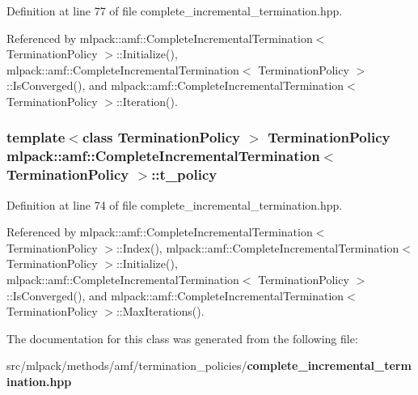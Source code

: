 Definition at line 77 of file complete\-\_\-incremental\-\_\-termination.\-hpp.



Referenced by mlpack\-::amf\-::\-Complete\-Incremental\-Termination$<$ Termination\-Policy $>$\-::\-Initialize(), mlpack\-::amf\-::\-Complete\-Incremental\-Termination$<$ Termination\-Policy $>$\-::\-Is\-Converged(), and mlpack\-::amf\-::\-Complete\-Incremental\-Termination$<$ Termination\-Policy $>$\-::\-Iteration().

\subsubsection[{t\-\_\-policy}]{\setlength{\rightskip}{0pt plus 5cm}template$<$class Termination\-Policy $>$ Termination\-Policy {\bf mlpack\-::amf\-::\-Complete\-Incremental\-Termination}$<$ Termination\-Policy $>$\-::t\-\_\-policy\hspace{0.3cm}{\ttfamily [private]}}\label{classmlpack_1_1amf_1_1CompleteIncrementalTermination_aea4baf9ded21272dd01e5b47a90ccc17}


Definition at line 74 of file complete\-\_\-incremental\-\_\-termination.\-hpp.



Referenced by mlpack\-::amf\-::\-Complete\-Incremental\-Termination$<$ Termination\-Policy $>$\-::\-Index(), mlpack\-::amf\-::\-Complete\-Incremental\-Termination$<$ Termination\-Policy $>$\-::\-Initialize(), mlpack\-::amf\-::\-Complete\-Incremental\-Termination$<$ Termination\-Policy $>$\-::\-Is\-Converged(), and mlpack\-::amf\-::\-Complete\-Incremental\-Termination$<$ Termination\-Policy $>$\-::\-Max\-Iterations().



The documentation for this class was generated from the following file\-:\begin{DoxyCompactItemize}
\item 
src/mlpack/methods/amf/termination\-\_\-policies/{\bf complete\-\_\-incremental\-\_\-termination.\-hpp}\end{DoxyCompactItemize}
